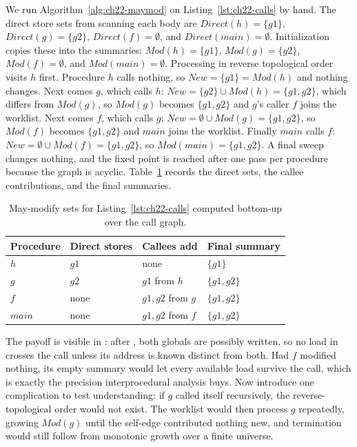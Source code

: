 We run Algorithm~\ref{alg:ch22-maymod} on Listing~\ref{lst:ch22-calls} by hand.
The direct store sets from scanning each body are $Direct(h) = \{g1\}$, $Direct(g) = \{g2\}$, $Direct(f) = \emptyset$, and $Direct(main) = \emptyset$.
Initialization copies these into the summaries: $Mod(h) = \{g1\}$, $Mod(g) = \{g2\}$, $Mod(f) = \emptyset$, and $Mod(main) = \emptyset$.
Processing in reverse topological order visits $h$ first.
Procedure $h$ calls nothing, so $New = \{g1\} = Mod(h)$ and nothing changes.
Next comes $g$, which calls $h$: $New = \{g2\} \cup Mod(h) = \{g1, g2\}$, which differs from $Mod(g)$, so $Mod(g)$ becomes $\{g1, g2\}$ and $g$'s caller $f$ joins the worklist.
Next comes $f$, which calls $g$: $New = \emptyset \cup Mod(g) = \{g1, g2\}$, so $Mod(f)$ becomes $\{g1, g2\}$ and $main$ joins the worklist.
Finally $main$ calls $f$: $New = \emptyset \cup Mod(f) = \{g1, g2\}$, so $Mod(main) = \{g1, g2\}$.
A final sweep changes nothing, and the fixed point is reached after one pass per procedure because the graph is acyclic.
Table~\ref{tab:ch22-mod} records the direct sets, the callee contributions, and the final summaries.

\begin{table}
  \centering
  \caption{May-modify sets for Listing~\ref{lst:ch22-calls} computed bottom-up over the call graph.}
  \label{tab:ch22-mod}
  \begin{tabular}{llll}
    \toprule
    Procedure & Direct stores & Callees add & Final summary \\
    \midrule
    $h$ & $g1$ & none & $\{g1\}$ \\
    $g$ & $g2$ & $g1$ from $h$ & $\{g1, g2\}$ \\
    $f$ & none & $g1, g2$ from $g$ & $\{g1, g2\}$ \\
    $main$ & none & $g1, g2$ from $f$ & $\{g1, g2\}$ \\
    \bottomrule
  \end{tabular}
\end{table}

The payoff is visible in : after , both globals are possibly written, so no load in  crosses the call unless its address is known distinct from both.
Had $f$ modified nothing, its empty summary would let every available load survive the call, which is exactly the precision interprocedural analysis buys.
Now introduce one complication to test understanding: if $g$ called itself recursively, the reverse-topological order would not exist.
The worklist would then process $g$ repeatedly, growing $Mod(g)$ until the self-edge contributed nothing new, and termination would still follow from monotonic growth over a finite universe.

